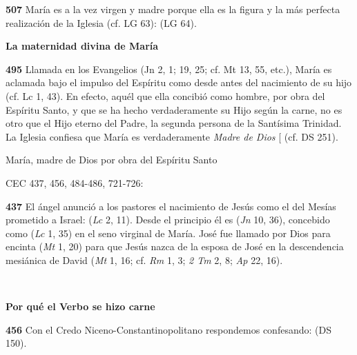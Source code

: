 \begin{body}
\begin{body}
\textbf{507} María es a la vez virgen y madre porque ella es la figura y la más perfecta realización de la Iglesia (cf. LG 63):  (LG 64).

\textbf{La maternidad divina de María}

\textbf{495} Llamada en los Evangelios  (Jn 2, 1; 19, 25; cf. Mt 13, 55, etc.), María es aclamada bajo el impulso del Espíritu como  desde antes del nacimiento de su hijo (cf. Lc 1, 43). En efecto, aquél que ella concibió como hombre, por obra del Espíritu Santo, y que se ha hecho verdaderamente su Hijo según la carne, no es otro que el Hijo eterno del Padre, la segunda persona de la Santísima Trinidad. La Iglesia confiesa que María es verdaderamente \emph{Madre de Dios} {[}\textquote{Theotokos}{]} (cf. DS 251).

María, madre de Dios por obra del Espíritu Santo

CEC 437, 456, 484-486, 721-726:

\textbf{437} El ángel anunció a los pastores el nacimiento de Jesús como el del Mesías prometido a Israel:  (\emph{Lc} 2, 11). Desde el principio él es  (\emph{Jn} 10, 36), concebido como  (\emph{Lc} 1, 35) en el seno virginal de María. José fue llamado por Dios para  encinta  (\emph{Mt} 1, 20) para que Jesús  nazca de la esposa de José en la descendencia mesiánica de David (\emph{Mt} 1, 16; cf. \emph{Rm} 1, 3; \emph{2 Tm} 2, 8; \emph{Ap} 22, 16).

\textbf{\\ }

\textbf{Por qué el Verbo se hizo carne}

\textbf{456} Con el Credo Niceno-Constantinopolitano respondemos confesando:  (DS 150).


\end{body}
\end{body}
